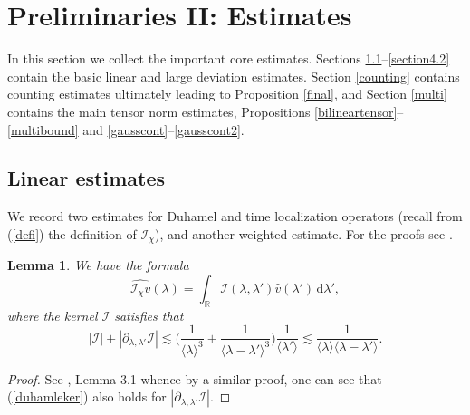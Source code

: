 \documentclass[11 pt,reqno]{amsart}
\newtheorem{lem}[thm]{Lemma}
\theoremstyle{definition}
\theoremstyle{remark}
\numberwithin{equation}{section}
\newcommand{\Ic}{\mathcal{I}}
\newcommand{\Rb}{\mathbb{R}}
\begin{document}
{\section{Preliminaries II: Estimates}\label{prelimtensor} In this section we collect the important core estimates. Sections \ref{section4.1}--\ref{section4.2} contain the basic linear and large deviation estimates. Section \ref{counting} contains counting estimates ultimately leading to Proposition \ref{final}, and Section \ref{multi} contains the main tensor norm estimates, Propositions \ref{bilineartensor}--\ref{multibound} and \ref{gausscont}--\ref{gausscont2}.
\subsection{Linear estimates}\label{section4.1} We record two estimates for Duhamel and time localization operators (recall from (\ref{defi}) the definition of $\Ic_\chi$), and another weighted estimate. For the proofs see \cite{DNY0,DNY}.
\begin{lem}\label{duhamelform0} We have the formula
\begin{equation}\label{duhamelform}\widehat{\Ic_\chi v}(\lambda)=\int_{\Rb}\Ic(\lambda,\lambda')\widehat{v}(\lambda')\,\mathrm{d}\lambda',
\end{equation} where the kernel $\Ic$ satisfies that
\begin{equation}\label{duhamleker}|\Ic|+|\partial_{\lambda,\lambda'}\Ic|\lesssim\bigg(\frac{1}{\langle \lambda\rangle^3}+\frac{1}{\langle\lambda-\lambda'\rangle^3}\bigg)\frac{1}{\langle\lambda'\rangle}\lesssim\frac{1}{\langle\lambda\rangle\langle\lambda-\lambda'\rangle}.
\end{equation}
\end{lem}
\begin{proof} See \cite{DNY0}, Lemma 3.1 whence by a similar proof, one can see that (\ref{duhamleker}) also holds for $|\partial_{\lambda,\lambda'}\Ic|$.
\end{proof}

}
\end{document}
